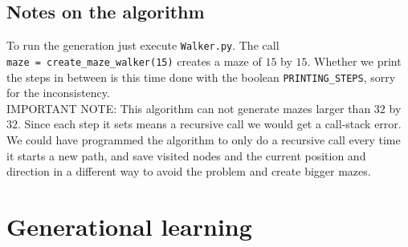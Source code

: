 \documentclass[10pt, a4paper, twoside]{amsart}
\newcommand{\1}{\mathbbm{1}}
\begin{document}
\subsection*{Notes on the algorithm}
To run the generation just execute \verb+Walker.py+. The call\\ \verb+maze = create_maze_walker(15)+ creates a maze of $15$ by $15$. Whether we print the steps in between is this time done with the boolean \verb+PRINTING_STEPS+, sorry for the inconsistency.\\

IMPORTANT NOTE: This algorithm can not generate mazes larger than $32$ by $32$. Since each step it sets means a recursive call we would get a call-stack error. We could have programmed the algorithm to only do a recursive call every time it starts a new path, and save visited nodes and the current position and direction in a different way to avoid the problem and create bigger mazes.

\section{Generational learning}
\end{document}
